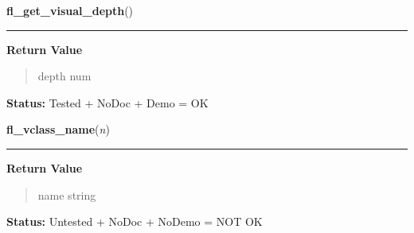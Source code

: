     \label{xformslib:library:fl_get_visual_depth}

    \vspace{0.5ex}

\hspace{.8\funcindent}\begin{boxedminipage}{\funcwidth}

    \raggedright \textbf{fl\_get\_visual\_depth}()

    \vspace{-1.5ex}

    \rule{\textwidth}{0.5\fboxrule}
\setlength{\parskip}{2ex}
\setlength{\parskip}{1ex}
      \textbf{Return Value}
    \vspace{-1ex}

      \begin{quote}
      depth num

      \end{quote}

\textbf{Status:} Tested + NoDoc + Demo = OK



    \end{boxedminipage}

    \label{xformslib:library:fl_vclass_name}

    \vspace{0.5ex}

\hspace{.8\funcindent}\begin{boxedminipage}{\funcwidth}

    \raggedright \textbf{fl\_vclass\_name}(\textit{n})

    \vspace{-1.5ex}

    \rule{\textwidth}{0.5\fboxrule}
\setlength{\parskip}{2ex}
\setlength{\parskip}{1ex}
      \textbf{Return Value}
    \vspace{-1ex}

      \begin{quote}
      name string

      \end{quote}

\textbf{Status:} Untested + NoDoc + NoDemo = NOT OK



    \end{boxedminipage}

